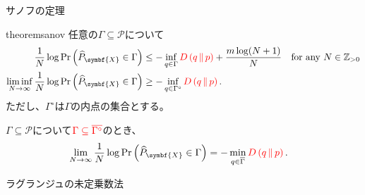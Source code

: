 \documentclass[lualatex,handout]{beamer}
\newcommand{\mycolor}[2]{%
  \begingroup
  \colorlet{currentcolor}{.}%
  \color{#1}#2%
  \color{currentcolor}%
  \endgroup
}
\newcommand{\emm}[1]{\mycolor{red}{#1}}
\newcommand\KL[2]{D\left(#1\,\|\,#2\right)}
\theoremstyle{definition}
\begin{document}
\begin{frame}{サノフの定理}
\begin{restatable}[サノフの定理]{theorem}{sanov}
\footnotesize
任意の$\Gamma\subseteq\mathcal{P}$について
\begin{align*}
\frac1N\log\Pr\left(\widehat{P}_{\symbf{X}} \in \Gamma\right) &\le -\inf_{q\in \Gamma} \emm{\KL{q}{p}} + \frac{m\log(N+1)}N\quad\text{for any $N\in\mathbb{Z}_{>0}$}\\
\liminf_{N\to\infty}\frac1N\log \Pr\left(\widehat{P}_{\symbf{X}} \in \Gamma\right) &\ge -\inf_{q\in \Gamma^\circ} \emm{\KL{q}{p}}.
\end{align*}
ただし、$\Gamma^\circ$は$\Gamma$の内点の集合とする。
\end{restatable}
\begin{corollary}
\footnotesize
$\Gamma\subseteq\mathcal{P}$について$\emm{\Gamma\subseteq\overline{\Gamma^\circ}}$のとき、
\begin{align*}
\lim_{N\to\infty}\frac1N\log \Pr\left(\widehat{P}_{\symbf{X}} \in \Gamma\right) &= -\min_{q\in \overline{\Gamma}} \emm{\KL{q}{p}}.
\end{align*}
\end{corollary}
\end{frame}

\begin{frame}{ラグランジュの未定乗数法}
\end{frame}
\end{document}
